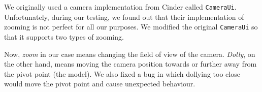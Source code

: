 We originally used a camera implementation from Cinder called \texttt{CameraUi}.
Unfortunately, during our testing, we found out that their implementation of zooming is not perfect for all our purposes.
We modified the original \texttt{CameraUi} so that it supports two types of zooming.

Now, \emph{zoom} in our case means changing the field of view of the camera.
\emph{Dolly}, on the other hand, means moving the camera position towards or further away from the pivot point (the model).
We also fixed a bug in which dollying too close would move the pivot point and cause unexpected behaviour.